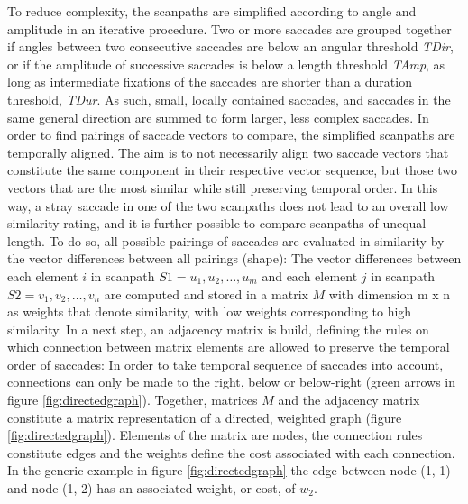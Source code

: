 \documentclass[a4paper, 12pt]{scrreprt}
\begin{document}
To reduce complexity, the scanpaths are simplified according to angle and amplitude in an iterative procedure. Two or more saccades are grouped together if angles between two consecutive saccades are below an angular threshold \textit{TDir}, or if the amplitude of successive saccades is below a length threshold \textit{TAmp}, as long as intermediate fixations of the saccades are shorter than a duration threshold, \textit{TDur}. As such, small, locally contained saccades, and saccades in the same general direction are summed to form larger, less complex saccades. \newline
In order to find pairings of saccade vectors to compare, the simplified scanpaths are temporally aligned. The aim is to not necessarily align two saccade vectors that constitute the same component in  their respective vector sequence, but those two vectors that are the most similar while still preserving temporal order. In this way, a stray saccade in one of the two scanpaths does not lead to an overall low similarity rating, and it is further possible to compare scanpaths of unequal length.  To do so, all possible pairings of saccades are evaluated in similarity by the vector differences between all pairings (shape): The vector differences between each element $i$ in scanpath $S1 = {u_1, u_2, \ldots, u_m}$ and each element $j$ in scanpath $S2 = {v_1, v_2, \ldots, v_n}$ are computed and stored in a matrix $M$ with dimension m x n as weights that denote similarity, with low weights corresponding to high similarity. In a next step, an adjacency matrix is build, defining the rules on which connection between matrix elements are allowed to preserve the temporal order of saccades: In order to take temporal sequence of saccades into account, connections can only be made to the right, below or below-right (green arrows in figure \ref{fig:directedgraph}). Together, matrices $M$ and the adjacency matrix constitute a matrix representation of a directed, weighted graph (figure \ref{fig:directedgraph}). Elements of the matrix are nodes, the connection rules constitute edges and the weights define the cost associated with each connection. 
In the generic example in figure \ref{fig:directedgraph} the edge between node (1, 1) and node (1, 2) has an associated weight, or cost, of $w_2$. 
\end{document}
